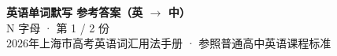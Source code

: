 \documentclass[10pt,a4paper]{article}
\begin{document}
\pagestyle{plain}

\begin{center}
{\LARGE\bfseries 英语单词默写 \quad 参考答案（英 $\to$ 中）}\\[0.22em]
{\large N 字母 · 第 1 / 2 份}\\[0.18em]
{\small 2026年上海市高考英语词汇用法手册 · 参照普通高中英语课程标准}
\end{center}

\vspace{0.2em}
\noindent{\color{rulegray}\rule{\textwidth}{0.8pt}}

\vspace{0.35em}

\vspace{0.25em}
\renewcommand{\arraystretch}{1.32}
\end{document}
